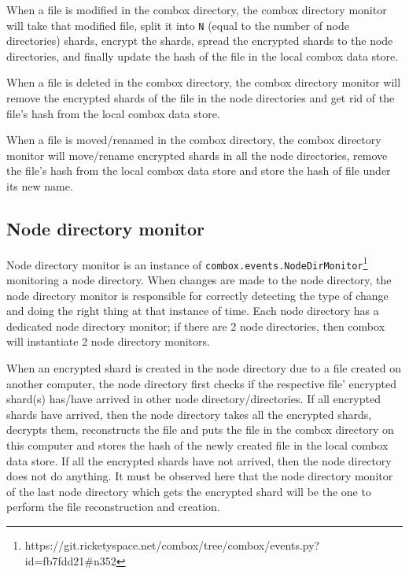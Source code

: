 When a file is modified in the combox directory, the combox directory
monitor will take that modified file, split it into \verb+N+ (equal to
the number of node directories) shards, encrypt the shards, spread the
encrypted shards to the node directories, and finally update the hash
of the file in the local combox data store.

When a file is deleted in the combox directory, the combox directory
monitor will remove the encrypted shards of the file in the node
directories and get rid of the file's hash from the local combox
data store.

When a file is moved/renamed in the combox directory, the combox
directory monitor will move/rename encrypted shards in all the node
directories, remove the file's hash from the local combox data store
and store the hash of file under its new name.

\subsection{Node directory monitor}\label{sec:3-combox-nodirm}

Node directory monitor is an instance of
\verb+combox.events.NodeDirMonitor+\footnote{https://git.ricketyspace.net/combox/tree/combox/events.py?id=fb7fdd21\#n352}
monitoring a node directory. When changes are made to the node
directory, the node directory monitor is responsible for correctly
detecting the type of change and doing the right thing at that
instance of time. Each node directory has a dedicated node directory
monitor; if there are 2 node directories, then combox will instantiate
2 node directory monitors.

When an encrypted shard is created in the node directory due to a file
created on another computer, the node directory first checks if the
respective file' encrypted shard(s) has/have arrived in other node
directory/directories. If all encrypted shards have arrived, then the
node directory takes all the encrypted shards, decrypts them,
reconstructs the file and puts the file in the combox directory on
this computer and stores the hash of the newly created file in the
local combox data store. If all the encrypted shards have not arrived,
then the node directory does not do anything. It must be observed here
that the node directory monitor of the last node directory which gets
the encrypted shard will be the one to perform the file reconstruction
and creation.


